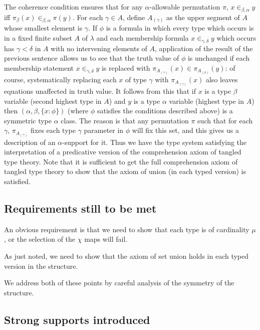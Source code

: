 \documentclass[12pt]{article}
\begin{document}
The coherence condition ensures that for any $\alpha$-allowable permutation $\pi$, $x \in_{\beta,\alpha} y$ iff $\pi_\beta(x) \in_{\beta,\alpha} \pi(y)$.  For each $\gamma \in A$, define $A_{(\gamma)}$ as the upper segment of $A$ whose smallest element is $\gamma$.  If $\phi$ is a formula in which every type which occurs is in a fixed finite subset $A$ of $\lambda$ and each membership formula $x \in_{\gamma,\delta} y$ which occurs has
$\gamma<\delta$ in $A$ with no intervening elements of $A$, application of the result of the previous sentence allows us to see that the truth value of $\phi$ is unchanged if each membership statement $x \in_{\gamma,\delta} y$ is replaced with $\pi_{A_{(\gamma)}}(x) \in \pi_{A_{(\delta)}}(y)$:  of course, systematically replacing each $x$ of type $\gamma$ with
$\pi_{A_{(\gamma)}}(x)$ also leaves equations unaffected in truth value.  It follows from this that if $x$ is a type $\beta$ variable (second highest type in $A$) and $y$ is a type $\alpha$ variable (highest type in $A$) then $(\alpha,\beta,\{x : \phi\})$ (where $\phi$ satisfies the conditions described above) is a symmetric type $\alpha$ class.  The reason is that any
permutation $\pi$ such that for each $\gamma$, $\pi_{A_{(\gamma)}}$ fixes each type $\gamma$ parameter in $\phi$ will fix this set, and this gives us a description of an $\alpha$-support for it.  Thus we have the type system satisfying the interpretation of a predicative version of the comprehension axiom of tangled type theory.  Note that it is sufficient to get the full comprehension axiom of
tangled type theory to show that the axiom of union (in each typed version) is satisfied.

\subsection{Requirements still to be met}

An obvious requirement is that we need to show that each type is of cardinality $\mu$, or the selection of the $\chi$ maps will fail.

As just noted, we need to show that the axiom of set union holds in each typed version in the structure.

We address both of these points by careful analysis of the symmetry of the structure.

\subsection{Strong supports introduced}
\end{document}
